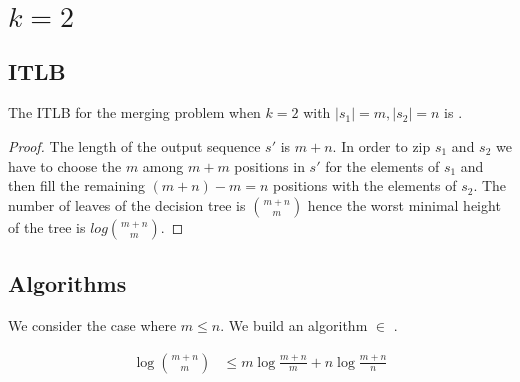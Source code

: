 \section{$k=2$}
\label{tree:merging:k=2}

\subsection{ITLB}
\label{tree:merging:k=2:ITLB}


\begin{theorem}
The ITLB for the merging problem when $k = 2$ with $|s_1| = m, |s_2| = n$ is .
\end{theorem}

\begin{proof}
The length of the output sequence $s'$ is $m+n$. In order to zip $s_1$ and $s_2$ we have to choose the $m$ among $m+m$ positions in $s'$ for the elements of $s_1$ and then fill the remaining $(m+n) - m = n$ positions with the elements of $s_2$. The number of leaves of the decision tree is $\binom{m+n}{m}$ hence the worst minimal height of the tree is $log \binom{m+n}{m}$.
\end{proof}



\subsection{Algorithms}
\label{tree:merging:k=2:alg}

We consider the case where $m \leq n$. We build an algorithm $\in$ .

\begin{lemma}
\begin{align*}
\log\binom{m+n}{m} &\leq m \log\frac{m+n}{m} + n \log\frac{m+n}{n}\\
\end{align*}
\end{lemma}

